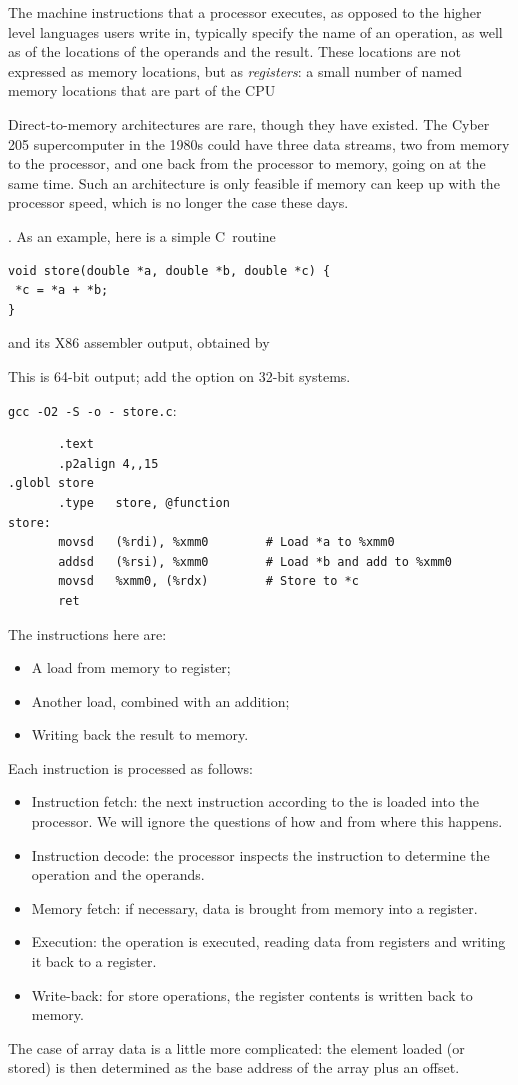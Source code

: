 The machine instructions that a processor executes, as opposed to the
higher level languages users write in, typically specify the name of
an operation, as well as of the locations of the operands and the
result. These locations are not expressed as memory locations, but as
\emph{registers}: a small number of named memory locations that
are part of the \ac{CPU}
\begin{footnoteenv}
  {Direct-to-memory architectures are rare,
  though they have existed. The Cyber 205 supercomputer in the 1980s
  could have three data streams, two from memory to the processor, and one
  back from the processor to memory, going on at the same time. Such
  an architecture is only feasible if memory can keep up with the
  processor speed, which is no longer the case these days.}
\end{footnoteenv}%
.  As an
example, here is a simple C~routine
\begin{verbatim}
void store(double *a, double *b, double *c) {
 *c = *a + *b;
}
\end{verbatim}
and its X86 assembler output, obtained by
\begin{footnoteenv}
  {This is 64-bit
    output; add the option  on 32-bit systems.}
\end{footnoteenv}
\verb+gcc -O2 -S -o - store.c+:
\begin{verbatim}
       .text
       .p2align 4,,15
.globl store
       .type   store, @function
store:
       movsd   (%rdi), %xmm0		# Load *a to %xmm0
       addsd   (%rsi), %xmm0		# Load *b and add to %xmm0
       movsd   %xmm0, (%rdx)		# Store to *c
       ret
\end{verbatim}
The instructions here are:
\begin{itemize}
\item A load from memory to register;
\item Another load, combined with an addition;
\item Writing back the result to memory.
\end{itemize}
Each instruction is processed as follows:
\begin{itemize}
\item Instruction fetch: the next instruction according to the
   is loaded into the processor. We will
  ignore the questions of how and from where this happens.
\item Instruction decode: the processor inspects the instruction to
  determine the operation and the operands.
\item Memory fetch: if necessary, data is brought from memory
    into a register.
\item Execution: the operation is executed, reading data from registers
  and writing it back to a register.
\item Write-back: for store operations, the register contents is
  written back to memory.
\end{itemize}
The case of array data is a little more complicated: the element
loaded (or stored) is then determined as the base address of the array
plus an offset.

